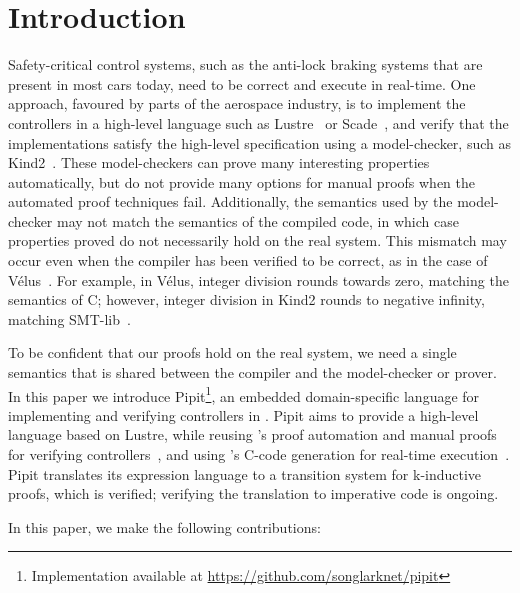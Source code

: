 \section{Introduction}
Safety-critical control systems, such as the anti-lock braking systems that are present in most cars today, need to be correct and execute in real-time.
One approach, favoured by parts of the aerospace industry, is to implement the controllers in a high-level language such as Lustre~\cite{caspi1995functional} or Scade~\cite{colaco2017scade}, and verify that the implementations satisfy the high-level specification using a model-checker, such as Kind2~\cite{champion2016kind2}.
These model-checkers can prove many interesting properties automatically, but do not provide many options for manual proofs when the automated proof techniques fail.
Additionally, the semantics used by the model-checker may not match the semantics of the compiled code, in which case properties proved do not necessarily hold on the real system.
This mismatch may occur even when the compiler has been verified to be correct, as in the case of Vélus~\cite{bourke2017formally}.
For example, in Vélus, integer division rounds towards zero, matching the semantics of C; however, integer division in Kind2 rounds to negative infinity, matching SMT-lib~\cite{BarFT2016SMTLIB,kind2023intdiv}.

To be confident that our proofs hold on the real system, we need a single semantics that is shared between the compiler and the model-checker or prover.
In this paper we introduce Pipit\footnote{Implementation available at \url{https://github.com/songlarknet/pipit}}, an embedded domain-specific language for implementing and verifying controllers in \fstar{}.
Pipit aims to provide a high-level language based on Lustre, while reusing \fstar{}'s proof automation and manual proofs for verifying controllers~\cite{martinez2019meta}, and using \lowstar{}'s C-code generation for real-time execution~\cite{protzenko2017verified}.
Pipit translates its expression language to a transition system for k-inductive proofs, which is verified; verifying the translation to imperative code is ongoing.



In this paper, we make the following contributions:

